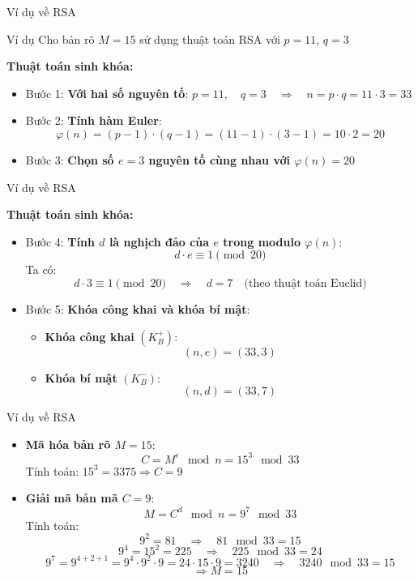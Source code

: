 \documentclass{beamer}
\numberwithin{equation}{section}
\begin{document}
\begin{frame}{Ví dụ về RSA}

\begin{block}{Ví dụ}
Cho bản rõ \(M = 15 \) sử dụng thuật toán RSA với \(p = 11 \), \(q = 3 \)
\end{block}

\textbf{Thuật toán sinh khóa:}

\begin{itemize}
\item Bước 1: \textbf{Với hai số nguyên tố}:
$p = 11, \quad q = 3 \quad \Rightarrow \quad n = p \cdot q = 11 \cdot 3 = 33$
\item Bước 2: \textbf{Tính hàm Euler}:
\[
\varphi(n) = (p - 1) \cdot (q - 1) = (11 - 1) \cdot (3 - 1) = 10 \cdot 2 = 20
\]
\item Bước 3: \textbf{Chọn số $e = 3$ nguyên tố cùng nhau với $\varphi(n) = 20$}
\end{itemize}

\end{frame}
\begin{frame}{Ví dụ về RSA}

\textbf{Thuật toán sinh khóa:}

\begin{itemize}

\item Bước 4: \textbf{Tính $d$ là nghịch đảo của $e$ trong modulo $\varphi(n)$}:
\[
d \cdot e \equiv 1 \pmod{20}
\]
Ta có:
\[
d \cdot 3 \equiv 1 \pmod{20} \quad \Rightarrow \quad d = 7 \quad \text{(theo thuật toán Euclid)}
\]

\item Bước 5: \textbf{Khóa công khai và khóa bí mật}:
\begin{itemize}
\item \textbf{Khóa công khai} $(K_B^+)$:
\[
(n, e) = (33, 3)
\]
\item \textbf{Khóa bí mật} $(K_B^-)$:
\[
(n, d) = (33, 7)
\]
\end{itemize}
\end{itemize}
\end{frame}
\begin{frame}{Ví dụ về RSA}

\begin{itemize}

\item \textbf{Mã hóa bản rõ $M = 15$}:
\[
C = M^e \mod n = 15^3 \mod 33
\]
Tính toán:
$15^3 = 3375 \Rightarrow C = 9$

\item \textbf{Giải mã bản mã $C = 9$}:
\[
M = C^d \mod n = 9^7 \mod 33
\]
Tính toán:
\[
9^2 = 81 \quad \Rightarrow \quad 81 \mod 33 = 15
\]
\[
9^4 = 15^2 = 225 \quad \Rightarrow \quad 225 \mod 33 = 24
\]
\[
9^7 = 9^{4+2+1} = 9^4 \cdot 9^2 \cdot 9 = 24 \cdot 15 \cdot 9 = 3240 \quad \Rightarrow \quad 3240 \mod 33 = 15
\]
\[
\Rightarrow M = 15
\]

\end{itemize}
\end{frame}
\end{document}
